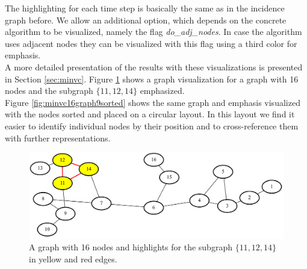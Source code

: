 \documentclass[a4paper, 12pt, bibliography=totoc]{scrartcl}
\begin{document}

The highlighting for each time step is basically the same as in the incidence graph before.
We allow an additional option, which depends on the concrete algorithm to be visualized, namely the flag \textit{do\_adj\_nodes}.
In case the algorithm uses adjacent nodes they can be visualized with this flag using a third color for emphasis.\\


A more detailed presentation of the results with these visualizations is presented in Section \ref{sec:minvc}.
Figure \ref{fig:minvc16graph9} shows a graph visualization for a graph with 16 nodes and the subgraph $\{11,12,14\}$ emphasized.\\
Figure \ref{fig:minvc16graph9sorted} shows the same graph and emphasis visualized with the nodes sorted and placed on a circular layout. In this layout we find it easier to identify individual nodes by their position and to cross-reference them with further representations.

\begin{figure}[H]
	\includegraphics[width=\linewidth]{images/minvc16graph9.png}
	\caption[Graph with 16 nodes]{A graph with 16 nodes and highlights for the subgraph $\{11,12,14\}$ in yellow and red edges.}
	\label{fig:minvc16graph9}
\end{figure}
\end{document}
